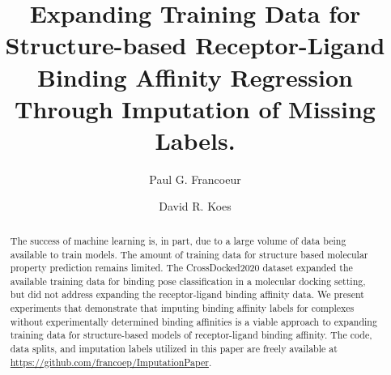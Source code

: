\documentclass[journal=jmcmar,manuscript=article]{achemso}
\author{Paul G. Francoeur}
\author{David R. Koes}
\affiliation[Pitt]{Department of Computational and Systems Biology, University of Pittsburgh, Pittsburgh, PA 15260}
\title[Imputation for Binding Affinity Regression]{Expanding Training Data for Structure-based Receptor-Ligand Binding Affinity Regression Through Imputation of Missing Labels.}
\begin{document}
\begin{tocentry}




\end{tocentry}

\begin{abstract}
The success of machine learning is, in part, due to a large volume of data being available to train models.
The amount of training data for structure based molecular property prediction remains  limited.
The CrossDocked2020 dataset expanded the available training data for binding pose classification in a molecular docking setting, but did not address expanding the receptor-ligand binding affinity data.
We present experiments that demonstrate that imputing binding affinity labels for complexes without experimentally determined binding affinities is a viable approach to expanding training data for structure-based models of receptor-ligand binding affinity.
The code, data splits, and imputation labels utilized in this paper are freely available at \url{https://github.com/francoep/ImputationPaper}.
\end{abstract}
\end{document}
